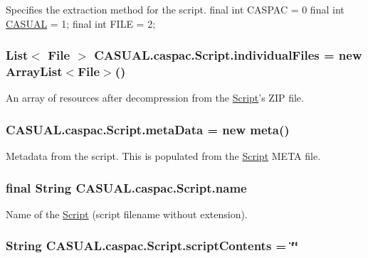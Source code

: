 Specifies the extraction method for the script. final int C\-A\-S\-P\-A\-C = 0 final int \hyperlink{namespace_c_a_s_u_a_l}{C\-A\-S\-U\-A\-L} = 1; final int F\-I\-L\-E = 2; \hypertarget{class_c_a_s_u_a_l_1_1caspac_1_1_script_a207f2b32857121fe8146739c6ef59927}{
\subsubsection[{individual\-Files}]{\setlength{\rightskip}{0pt plus 5cm}List$<$ File $>$ C\-A\-S\-U\-A\-L.\-caspac.\-Script.\-individual\-Files = new Array\-List$<$File$>$()}}\label{class_c_a_s_u_a_l_1_1caspac_1_1_script_a207f2b32857121fe8146739c6ef59927}
An array of resources after decompression from the \hyperlink{class_c_a_s_u_a_l_1_1caspac_1_1_script}{Script}'s Z\-I\-P file. \hypertarget{class_c_a_s_u_a_l_1_1caspac_1_1_script_a5b58ff7a14e102e7014742deb3c69bf2}{
\subsubsection[{meta\-Data}]{ C\-A\-S\-U\-A\-L.\-caspac.\-Script.\-meta\-Data = new {\bf meta}()}}\label{class_c_a_s_u_a_l_1_1caspac_1_1_script_a5b58ff7a14e102e7014742deb3c69bf2}
Metadata from the script. This is populated from the \hyperlink{class_c_a_s_u_a_l_1_1caspac_1_1_script}{Script} M\-E\-T\-A file. \hypertarget{class_c_a_s_u_a_l_1_1caspac_1_1_script_a3efcef19df03c62a6c70b08dc56630a7}{
\subsubsection[{name}]{\setlength{\rightskip}{0pt plus 5cm}final String C\-A\-S\-U\-A\-L.\-caspac.\-Script.\-name}}\label{class_c_a_s_u_a_l_1_1caspac_1_1_script_a3efcef19df03c62a6c70b08dc56630a7}
Name of the \hyperlink{class_c_a_s_u_a_l_1_1caspac_1_1_script}{Script} (script filename without extension). \hypertarget{class_c_a_s_u_a_l_1_1caspac_1_1_script_aea41000f3b6648674b00a913f92b3430}{
\subsubsection[{script\-Contents}]{\setlength{\rightskip}{0pt plus 5cm}String C\-A\-S\-U\-A\-L.\-caspac.\-Script.\-script\-Contents = \char`\"{}\char`\"{}}}\label{class_c_a_s_u_a_l_1_1caspac_1_1_script_aea41000f3b6648674b00a913f92b3430}
